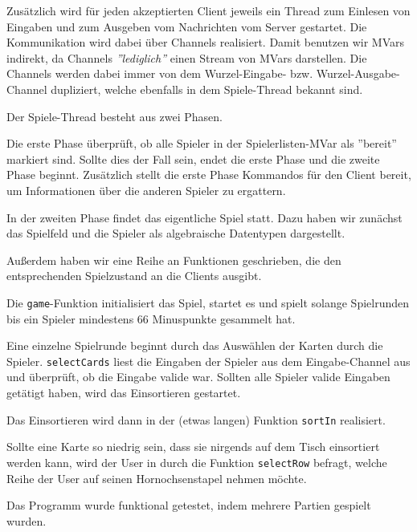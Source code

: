\documentclass{rp}
\begin{document}
Zusätzlich wird für jeden akzeptierten Client jeweils ein Thread zum Einlesen von Eingaben und zum Ausgeben vom Nachrichten vom Server gestartet. Die Kommunikation wird dabei über Channels realisiert. Damit benutzen wir MVars indirekt, da Channels \textit{''lediglich''} einen Stream von MVars darstellen. Die Channels werden dabei immer von dem Wurzel-Eingabe- bzw. Wurzel-Ausgabe-Channel dupliziert, welche ebenfalls in dem Spiele-Thread bekannt sind. 

Der Spiele-Thread besteht aus zwei Phasen.

Die erste Phase überprüft, ob alle Spieler in der Spielerlisten-MVar als ''bereit'' markiert sind. Sollte dies der Fall sein, endet die erste Phase und die zweite Phase beginnt. Zusätzlich stellt die erste Phase Kommandos für den Client bereit, um Informationen über die anderen Spieler zu ergattern. 

In der zweiten Phase findet das eigentliche Spiel statt. Dazu haben wir zunächst das Spielfeld und die Spieler als algebraische Datentypen dargestellt. 

Außerdem haben wir eine Reihe an Funktionen geschrieben, die den entsprechenden Spielzustand an die Clients ausgibt. 

Die \texttt{game}-Funktion initialisiert das Spiel, startet es und spielt solange Spielrunden bis ein Spieler mindestens 66 Minuspunkte gesammelt hat. 

Eine einzelne Spielrunde beginnt durch das Auswählen der Karten durch die Spieler. \texttt{selectCards} liest die Eingaben der Spieler aus dem Eingabe-Channel aus und überprüft, ob die Eingabe valide war. Sollten alle Spieler valide Eingaben getätigt haben, wird das Einsortieren gestartet. 

Das Einsortieren wird dann in der (etwas langen) Funktion \texttt{sortIn} realisiert. 

Sollte eine Karte so niedrig sein, dass sie nirgends auf dem Tisch einsortiert werden kann, wird der User in durch die Funktion \texttt{selectRow} befragt, welche Reihe der User auf seinen Hornochsenstapel nehmen möchte. 

Das Programm wurde funktional getestet, indem mehrere Partien gespielt wurden. 
\end{document}
